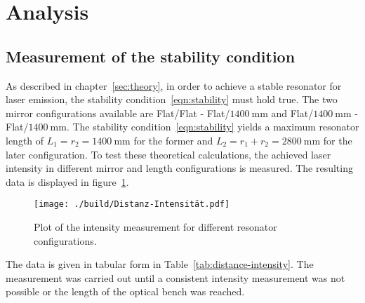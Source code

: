 \section{Analysis}
\subsection{Measurement of the stability condition}
As described in chapter~\ref{sec:theory}, in order to achieve a stable resonator
for laser emission, the stability condition~\ref{eqn:stability} must hold true.
The two mirror configurations available are Flat/Flat - Flat/$\SI{1400}{\milli\meter}$ and
Flat/$\SI{1400}{\milli\meter}$ - Flat/$\SI{1400}{\milli\meter}$. The stability condition~\ref{eqn:stability}
yields a maximum resonator length of $L_{1} = r_{2} = \SI{1400}{\milli\meter}$ for the former and
$L_{2} = r_{1} + r_{2} = \SI{2800}{\milli\meter}$ for the later configuration.
To test these theoretical calculations, the achieved laser intensity in different
mirror and length configurations is measured. The resulting data is displayed in figure~\ref{fig:distance-intesity}.
\begin{figure}[H]
 \centering
 \texttt{[image: ./build/Distanz-Intensität.pdf]}
 \caption{Plot of the intensity measurement for different resonator configurations.}
 \label{fig:distance-intesity}
\end{figure}
\noindent
The data is given in tabular form in Table~\ref{tab:distance-intensity}.
The measurement was carried out until a consistent intensity measurement was not possible or the length of the
optical bench was reached.
